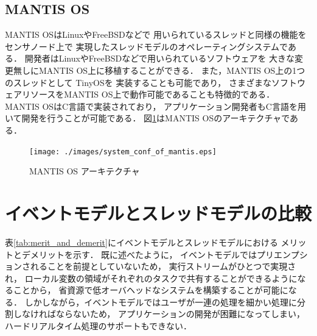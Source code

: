 \subsection{MANTIS OS}
MANTIS OS\cite{Bhatti:2005:MOE:1160162.1160178}はLinuxやFreeBSDなどで
用いられているスレッドと同様の機能をセンサノード上で
実現したスレッドモデルのオペレーティングシステムである．
開発者はLinuxやFreeBSDなどで用いられているソフトウェアを
大きな変更無しにMANTIS OS上に移植することができる．
また，MANTIS OS上の1つのスレッドとして
TinyOS\cite{Hill:2000:SAD:356989.356998}\cite{Levis04tinyos:an}を
実装することも可能であり\cite{Trumpler06asystematic}，
さまざまなソフトウェアリソースをMANTIS OS上で動作可能であることも特徴的である．
MANTIS OSはC言語で実装されており，
アプリケーション開発者もC言語を用いて開発を行うことが可能である．
図\ref{fig:system_conf_of_mantis}はMANTIS OSのアーキテクチャである．


\begin{figure}[htbp]
 \begin{center}
  \texttt{[image: ./images/system\_conf\_of\_mantis.eps]}
 \end{center}
 \caption{MANTIS OS アーキテクチャ}
 \label{fig:system_conf_of_mantis}
\end{figure}



\section{イベントモデルとスレッドモデルの比較}
表\ref{tab:merit_and_demerit}にイベントモデルとスレッドモデルにおける
メリットとデメリットを示す．
既に述べたように，
イベントモデルではプリエンプションされることを前提としていないため，
実行ストリームがひとつで実現され，
ローカル変数の領域がそれぞれのタスクで共有することができるようになることから，
省資源で低オーバヘッドなシステムを構築することが可能になる．
しかしながら，イベントモデルではユーザが一連の処理を細かい処理に分割しなければならないため，
アプリケーションの開発が困難になってしまい，
ハードリアルタイム処理のサポートもできない．


